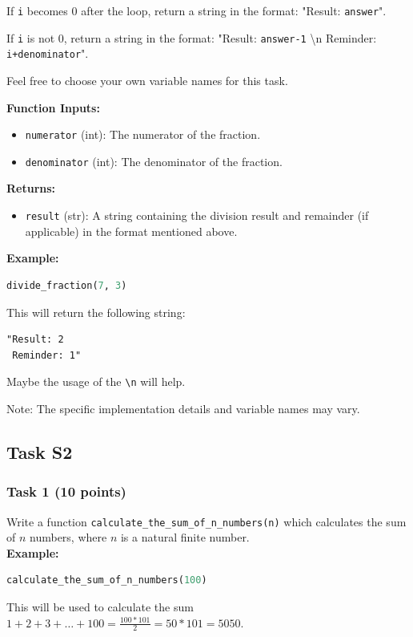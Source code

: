 \documentclass[12pt]{article}
\begin{document}
If \texttt{i} becomes 0 after the loop, return a string in the format: "Result: \texttt{answer}".

If \texttt{i} is not 0, return a string in the format: "Result: \texttt{answer-1} \textbackslash n Reminder: \texttt{i+denominator}".

Feel free to choose your own variable names for this task.

\textbf{Function Inputs:}
\begin{itemize}
\item \texttt{numerator} (int): The numerator of the fraction.
\item \texttt{denominator} (int): The denominator of the fraction.
\end{itemize}

\textbf{Returns:}
\begin{itemize}
\item \texttt{result} (str): A string containing the division result and remainder (if applicable) in the format mentioned above.
\end{itemize}

\textbf{Example:}
\begin{lstlisting}[language=Python]
divide_fraction(7, 3)
\end{lstlisting}
This will return the following string:
\begin{verbatim}
"Result: 2
 Reminder: 1"
\end{verbatim}
Maybe the usage of the \texttt{\textbackslash n} will help.

Note: The specific implementation details and variable names may vary.

\newpage
\subsection{Task S2}
\subsubsection{Task 1 (10 points)}
Write a function \texttt{calculate\_the\_sum\_of\_n\_numbers(n)} which calculates the sum of $n$ numbers, where $n$ is a natural finite number. \\
\textbf{Example:}
\begin{lstlisting}[language=Python]
calculate_the_sum_of_n_numbers(100)
\end{lstlisting}
This will be used to calculate the sum $1 + 2 + 3 + \dots + 100 = \frac{100*101}{2} = 50*101 = 5050$.
\end{document}

